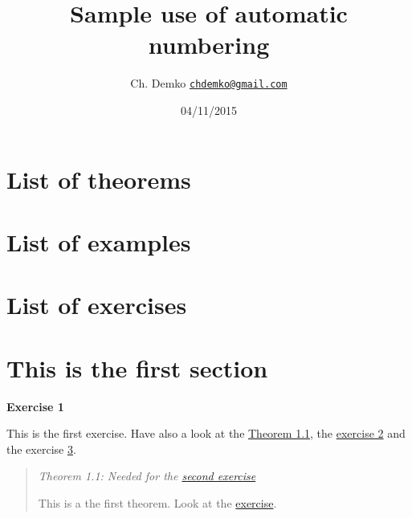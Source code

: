 \documentclass[]{article}
\title{Sample use of automatic numbering}
\author{Ch. Demko \href{mailto:chdemko@gmail.com}{\nolinkurl{chdemko@gmail.com}}}
\date{04/11/2015}
\begin{document}
\maketitle

\section*{List of theorems}

\hypersetup{linkcolor=black}\makeatletter\newcommand*{}\makeatother

\section*{List of examples}

\hypersetup{linkcolor=black}\makeatletter\newcommand*{}\makeatother

\section*{List of exercises}

\hypersetup{linkcolor=black}\makeatletter\newcommand*{}\makeatother

\hypertarget{this-is-the-first-section}{%
\section{This is the first section}\label{this-is-the-first-section}}

\protect\hypertarget{exercise:1}{}{\label{exercise:1}\textbf{Exercise
1}}

This is the first exercise. Have also a look at the
\protect\hyperlink{theorem:first}{Theorem 1.1}, the
\protect\hyperlink{exercise:second}{exercise 2} and the exercise
\protect\hyperlink{exercise:last}{3}.

\begin{quote}
\protect\hypertarget{theorem:first}{}{\label{theorem:first}\emph{Theorem
1.1: Needed for the \protect\hyperlink{exercise:second}{second
exercise}}}

This is a the first theorem. Look at the
\protect\hyperlink{exercise:second}{exercise}.
\end{quote}
\end{document}
